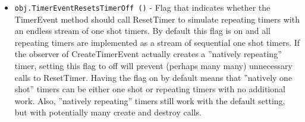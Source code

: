 \begin{itemize}
\item  \verb|obj.TimerEventResetsTimerOff ()| -  Flag that indicates whether the TimerEvent method should call ResetTimer
 to simulate repeating timers with an endless stream of one shot timers.
 By default this flag is on and all repeating timers are implemented as a
 stream of sequential one shot timers. If the observer of
 CreateTimerEvent actually creates a ''natively repeating'' timer, setting
 this flag to off will prevent (perhaps many many) unnecessary calls to
 ResetTimer. Having the flag on by default means that ''natively one
 shot'' timers can be either one shot or repeating timers with no
 additional work. Also, ''natively repeating'' timers still work with the
 default setting, but with potentially many create and destroy calls.

\end{itemize}
